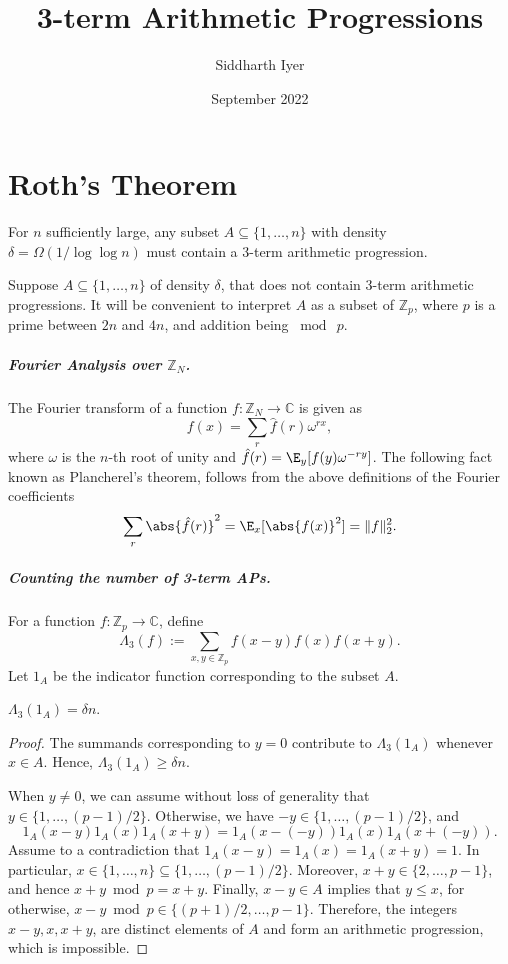 \documentclass{article}
\title{3-term Arithmetic Progressions}
\author{Siddharth Iyer}
\date{September 2022}
\begin{document}
\maketitle
\section{Roth's Theorem}
\begin{theorem}
For $n$ sufficiently large, any subset $A\subseteq \{1,\ldots,n\}$ with density $\delta = \Omega(1/\log\log n)$ must contain a 3-term arithmetic progression.
\end{theorem}

Suppose $A \subseteq \{1,
\ldots,n\}$ of density $\delta$, that does not contain 3-term arithmetic progressions. It will be convenient to interpret $A$ as a subset of $\mathbb{Z}_p$, where $p$ is a prime between $2n$ and $4n$, and addition being $\bmod~p$.

\subparagraph*{Fourier Analysis over $\mathbb{Z}_N$.} 
The Fourier transform of a function $f: \mathbb{Z}_N \to \mathbb{C}$ is given as 
$$f(x) = \sum_{r}\hat{f}(r)\omega^{rx},$$
where $\omega$ is the $n$-th root of unity and $\hat{f}(r) = \E_y[f(y)\omega^{-ry}]$. The following fact known as Plancherel's theorem, follows from the above definitions of the Fourier coefficients
$$\sum_r\abs{\hat{f}(r)}^2 = \E_{x}[\abs{f(x)}^2] = \|f\|_2^2.$$

\subparagraph*{Counting the number of 3-term APs.} For a function $f:\mathbb{Z}_p \to \mathbb{C}$, define $$\Lambda_3(f) := \sum_{x,y\in \mathbb{Z}_p}f(x-y)f(x)f(x+y).$$
Let $1_A$ be the indicator function corresponding to the subset $A$. 

\begin{obs}
$\Lambda_3(1_A) = \delta n$.
\end{obs}
\begin{proof}
The summands corresponding to $y=0$ contribute to $\Lambda_3(1_A)$ whenever $x\in A$. Hence, $\Lambda_3(1_A) \geq \delta n$. 

When $y\neq 0$, we can assume without loss of generality that $y\in \{1,\ldots,(p-1)/2\}$. Otherwise, we have $-y \in \{1,\ldots,(p-1)/2\}$, and $$1_A(x-y)1_A(x)1_A(x+y) = 1_A(x-(-y))1_A(x)1_A(x+(-y)).$$ 
Assume to a contradiction that $1_A(x-y) = 1_A(x) = 1_A(x+y) = 1$. In particular, $x\in \{1,\ldots,n\}\subseteq \{1,\ldots,(p-1)/2\}$. Moreover, $x+y \in \{2,\ldots,p-1\}$, and hence $x+y\bmod p = x+y$. Finally, $x-y\in A$ implies that $y \leq x$, for otherwise, $x-y\bmod p  \in \{(p+1)/2,\ldots,p-1\}$. Therefore, the integers $x-y,x,x+y$, are distinct elements of $A$ and form an arithmetic progression, which is impossible. 
\end{proof}
\end{document}
